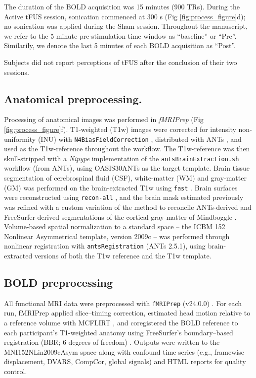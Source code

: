 The duration of the BOLD acquisition was 15 minutes (900 TRs). During the Active tFUS session, sonication commenced at 300 s (Fig \ref{fig:process_figure}d); no sonication was applied during the Sham session. Throughout the manuscript, we refer to the 5 minute pre-stimulation time window as ``baseline'' or ``Pre''. Similarily, we denote the last 5 minutes of each BOLD acquisition as ``Post''. 

Subjects did not report perceptions of tFUS after the conclusion of their two sessions. 

\subsection*{Anatomical preprocessing.}
\noindent
Processing of anatomical images was performed in \emph{fMRIPrep} \cite{fmriprep1,fmriprep2,nipype1,nipype2} (Fig \ref{fig:process_figure}f). T1-weighted (T1w) images were corrected for intensity non-uniformity (INU) with \texttt{N4BiasFieldCorrection} \cite{n4}, distributed with ANTs \cite{ants}, and used as the T1w-reference throughout the workflow. The T1w-reference was then skull-stripped with a \emph{Nipype} implementation of the \texttt{antsBrainExtraction.sh} workflow (from ANTs), using OASIS30ANTs as the target template. Brain tissue segmentation of cerebrospinal fluid (CSF), white-matter (WM) and gray-matter (GM) was performed on the brain-extracted T1w using \texttt{fast} \cite{fsl_fast}. Brain surfaces were reconstructed using \texttt{recon-all} \cite{fs_reconall}, and the brain mask estimated previously was refined with a custom variation of the method to reconcile ANTs-derived and FreeSurfer-derived segmentations of the cortical gray-matter of Mindboggle \cite{mindboggle}. Volume-based spatial normalization to a standard space -- the ICBM 152 Nonlinear Asymmetrical template, version 2009c \cite{mni152nlin2009casym} -- was performed through nonlinear registration with \texttt{antsRegistration} (ANTs 2.5.1), using brain-extracted versions of both the T1w reference and the T1w template. 


\subsection*{BOLD preprocessing}
\noindent 
All functional MRI data were preprocessed with \texttt{fMRIPrep} (v24.0.0) \cite{fmriprep1,fmriprep2}. For each run, fMRIPrep applied slice–timing correction, estimated head motion relative to a reference volume with MCFLIRT \cite{mcflirt}, and coregistered the BOLD reference to each participant’s T1-weighted anatomy using FreeSurfer’s boundary–based registration (BBR; 6 degrees of freedom) \cite{bbr}. Outputs were written to the MNI152NLin2009cAsym space along with confound time series (e.g., framewise displacement, DVARS, CompCor, global signals) and HTML reports for quality control.

